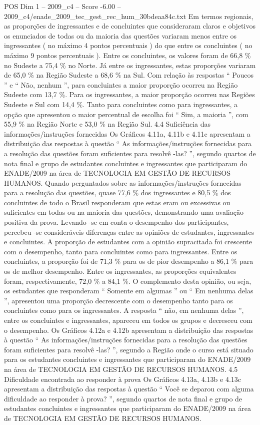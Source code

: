 \begin{textsample}{POS Dim 1 – 2009\_c4 – Score -6.00 – 2009\_c4/enade\_2009\_tec\_gest\_rec\_hum\_30bdeaa84c.txt}
Em termos regionais, as proporções de ingressantes e de concluintes que consideraram claros e objetivos os enunciados de todas ou da maioria das questões variaram menos entre os ingressantes ( no máximo 4 pontos percentuais ) do que entre os concluintes ( no máximo 9 pontos percentuais ).
Entre os concluintes, os valores foram de 66,8 \% no Sudeste a 75,4 \% no Norte.
Já entre os ingressantes, estas proporções variaram de 65,0 \% na Região Sudeste a 68,6 \% na Sul.
Com relação às respostas “ Poucos ” e “ Não, nenhum ”, para concluintes a maior proporção ocorreu na Região Sudeste com 13,7 \%.
Para os ingressantes, a maior proporção ocorreu nas Regiões Sudeste e Sul com 14,4 \%.
Tanto para concluintes como para ingressantes, a opção que apresentou o maior percentual de escolha foi “ Sim, a maioria ”, com 55,9 \% na Região Norte e 53,0 \% na Região Sul. 4.4 Suficiência das informações/instruções fornecidas Os Gráficos 4.11a, 4.11b e 4.11c apresentam a distribuição das respostas à questão “ As informações/instruções fornecidas para a resolução das questões foram suficientes para resolvê -las? ”, segundo quartos de nota final e grupo de estudantes concluintes e ingressantes que participaram do ENADE/2009 na área de TECNOLOGIA EM GESTÃO DE RECURSOS HUMANOS.
Quando perguntados sobre as informações/instruções fornecidas para a resolução das questões, quase 77,6 \% dos ingressantes e 80,5 \% dos concluintes de todo o Brasil responderam que estas eram ou excessivas ou suficientes em todas ou na maioria das questões, demonstrando uma avaliação positiva da prova.
Levando -se em conta o desempenho dos participantes, percebeu -se consideráveis diferenças entre as opiniões de estudantes, ingressantes e concluintes.
A proporção de estudantes com a opinião supracitada foi crescente com o desempenho, tanto para concluintes como para ingressantes.
Entre os concluintes, a proporção foi de 71,3 \% para os de pior desempenho a 86,1 \% para os de melhor desempenho.
Entre os ingressantes, as proporções equivalentes foram, respectivamente, 72,0 \% a 84,1 \%.
O complemento desta opinião, ou seja, os estudantes que responderam “ Somente em algumas ” ou “ Em nenhuma delas ”, apresentou uma proporção decrescente com o desempenho tanto para os concluintes como para os ingressantes.
A resposta “ não, em nenhuma delas ”, entre os concluintes e ingressantes, apareceu em todos os grupos e decresceu com o desempenho.
Os Gráficos 4.12a e 4.12b apresentam a distribuição das respostas à questão “ As informações/instruções fornecidas para a resolução das questões foram suficientes para resolvê -las? ”, segundo a Região onde o curso está situado para os estudantes concluintes e ingressantes que participaram do ENADE/2009 na área de TECNOLOGIA EM GESTÃO DE RECURSOS HUMANOS. 4.5 Dificuldade encontrada ao responder à prova Os Gráficos 4.13a, 4.13b e 4.13c apresentam a distribuição das respostas à questão “ Você se deparou com alguma dificuldade ao responder à prova? ”, segundo quartos de nota final e grupo de estudantes concluintes e ingressantes que participaram do ENADE/2009 na área de TECNOLOGIA EM GESTÃO DE RECURSOS HUMANOS.

\end{textsample}
